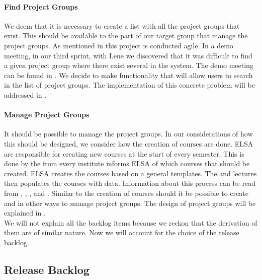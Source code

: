 \paragraph{Find Project Groups}
We deem that it is necessary to create a list with all the project groups that exist.
This should be available to the part of our target group that manage the project groups.
As mentioned in  this project is conducted agile. 
In a demo meeting, in our third sprint, with Lene we discovered that it was difficult to find a given project group where there exist several in the system.
The demo meeting can be found in . 
We decide to make functionality that will allow users to search in the list of project groups.
The implementation of this concrete problem will be addressed in .

\paragraph{Manage Project Groups}
It should be possible to manage the project groups. In our considerations of how this should be designed, we consider how the creation of courses are done. 
ELSA are responsible for creating new courses at the start of every semester. 
This is done by the \admpers{} from every institute informs ELSA of which courses that should be created. 
ELSA creates the courses based on a general templates.
The \admpers{} and lectures then populates the courses with data. 
Information about this process can be read from , ,  , and .
Similar to the creation of courses should it be possible to create and in other ways to manage project groups. 
The design of project groups will be explained in \secref{}. \\

We will not explain all the backlog items because we reckon that the derivation of them are of similar nature.
Now we will account for the choice of the release backlog.

\subsection{Release Backlog}






\begin{comment}
In the interview described in \appref{sec:lene} we learned that there is a need for having a concept of project groups in \moodle{}.  to enhance communication by sending messages from the \admpers{} to project groups through \moodle{}.
This evolves into two backlog items; integrate the concept of project groups into \moodle{} and allow the administrative personnel to post messages to the project group.
The former is represented as a backlog item which can be seen in \figref{fig:productbacklog}.
The latter is implemented by the \supervisorgroup{}.
\end{comment}



